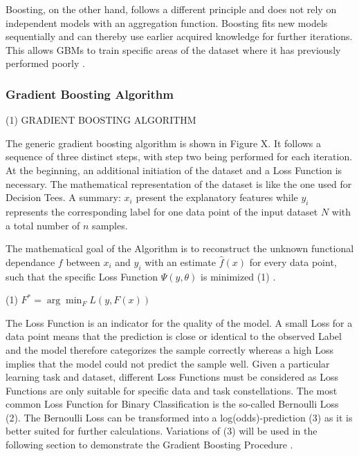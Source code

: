 Boosting, on the other hand, follows a different principle and does not rely on independent 
models with an aggregation function. Boosting fits new models sequentially and can thereby use 
earlier acquired knowledge for further iterations. This allows GBMs to train specific areas of 
the dataset where it has previously performed poorly \cite[p.345f]{James2021}.  

\subsubsection{Gradient Boosting Algorithm}
\label{sec:Gradient Boosting Algorithm}

(1) GRADIENT BOOSTING ALGORITHM 

The generic gradient boosting algorithm is shown in Figure X. It follows a sequence of three 
distinct steps, with step two being performed for each iteration. At the beginning, an 
additional initiation of the dataset and a Loss Function is necessary. The mathematical 
representation of the dataset is like the one used for Decision Tees. A summary: \(x_{i}\) present the 
explanatory features while \(y_{i}\) represents the corresponding label for one data point of the input 
dataset \(N\) with a total number of \(n\) samples. 

The mathematical goal of the Algorithm is to reconstruct the unknown functional dependance \(f\) 
between \(x_{i}\) and \(y_{i}\) with an estimate \(\hat{f} (x)\) for every data point, such that the specific Loss 
Function \(\Psi (y,\theta )\) is minimized (1) \cite[p.1189]{Friedman_2001} \cite[2.1]{Natekin2013}. 

(1) \(F^{*} = \arg \min_{F} L(y, F(x))\)


The Loss Function is an indicator for the quality of the model. A small Loss for a data point 
means that the prediction is close or identical to the observed Label and the model therefore 
categorizes the sample correctly whereas a high Loss implies that the model could not predict 
the sample well. Given a particular learning task and dataset, different Loss Functions must 
be considered as Loss Functions are only suitable for specific data and task constellations. The most common 
Loss Function for Binary Classification is the so-called Bernoulli Loss (2). The Bernoulli Loss 
can be transformed into a log(odds)-prediction (3) as it is better suited for further calculations. 
Variations of (3) will be used in the following section to demonstrate the Gradient Boosting 
Procedure \cite[3.1]{Natekin2013}. 

